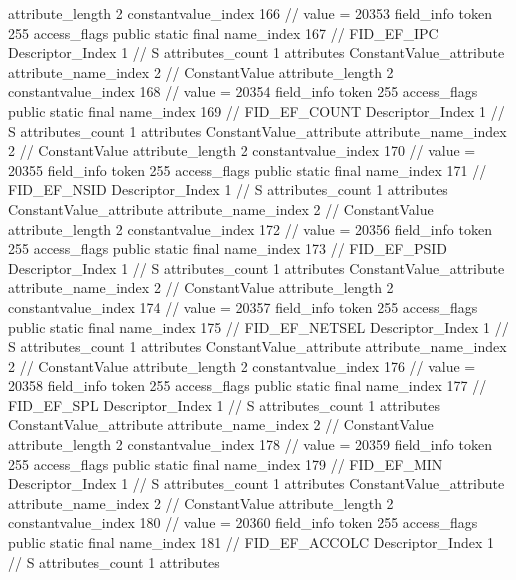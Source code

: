 {{{{{{{					attribute_length	2
					constantvalue_index	166		// value = 20353
				}
				}
			}
			field_info {
				token	255
				access_flags	public static final
				name_index	167		// FID_EF_IPC
				Descriptor_Index	1		// S
				attributes_count	1
				attributes {
				ConstantValue_attribute {
					attribute_name_index	2		// ConstantValue
					attribute_length	2
					constantvalue_index	168		// value = 20354
				}
				}
			}
			field_info {
				token	255
				access_flags	public static final
				name_index	169		// FID_EF_COUNT
				Descriptor_Index	1		// S
				attributes_count	1
				attributes {
				ConstantValue_attribute {
					attribute_name_index	2		// ConstantValue
					attribute_length	2
					constantvalue_index	170		// value = 20355
				}
				}
			}
			field_info {
				token	255
				access_flags	public static final
				name_index	171		// FID_EF_NSID
				Descriptor_Index	1		// S
				attributes_count	1
				attributes {
				ConstantValue_attribute {
					attribute_name_index	2		// ConstantValue
					attribute_length	2
					constantvalue_index	172		// value = 20356
				}
				}
			}
			field_info {
				token	255
				access_flags	public static final
				name_index	173		// FID_EF_PSID
				Descriptor_Index	1		// S
				attributes_count	1
				attributes {
				ConstantValue_attribute {
					attribute_name_index	2		// ConstantValue
					attribute_length	2
					constantvalue_index	174		// value = 20357
				}
				}
			}
			field_info {
				token	255
				access_flags	public static final
				name_index	175		// FID_EF_NETSEL
				Descriptor_Index	1		// S
				attributes_count	1
				attributes {
				ConstantValue_attribute {
					attribute_name_index	2		// ConstantValue
					attribute_length	2
					constantvalue_index	176		// value = 20358
				}
				}
			}
			field_info {
				token	255
				access_flags	public static final
				name_index	177		// FID_EF_SPL
				Descriptor_Index	1		// S
				attributes_count	1
				attributes {
				ConstantValue_attribute {
					attribute_name_index	2		// ConstantValue
					attribute_length	2
					constantvalue_index	178		// value = 20359
				}
				}
			}
			field_info {
				token	255
				access_flags	public static final
				name_index	179		// FID_EF_MIN
				Descriptor_Index	1		// S
				attributes_count	1
				attributes {
				ConstantValue_attribute {
					attribute_name_index	2		// ConstantValue
					attribute_length	2
					constantvalue_index	180		// value = 20360
				}
				}
			}
			field_info {
				token	255
				access_flags	public static final
				name_index	181		// FID_EF_ACCOLC
				Descriptor_Index	1		// S
				attributes_count	1
				attributes {
}}}}}}
